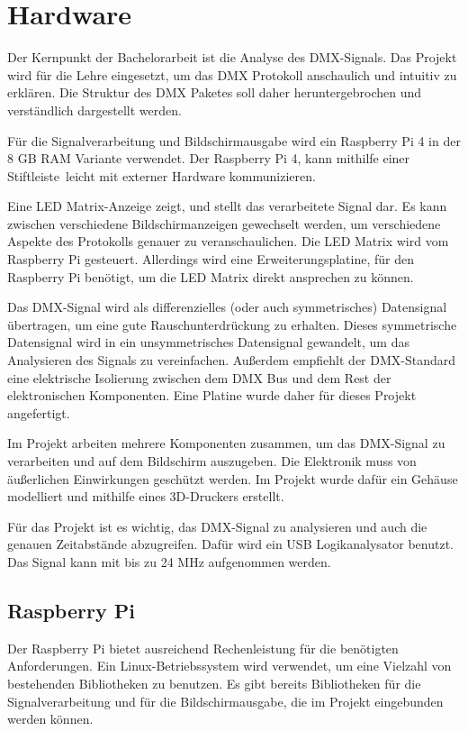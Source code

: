 \chapter{Hardware}

Der Kernpunkt der Bachelorarbeit ist die Analyse des DMX-Signals. Das Projekt wird für die Lehre eingesetzt, um das DMX Protokoll anschaulich und intuitiv zu erklären. Die Struktur des DMX Paketes soll daher heruntergebrochen und verständlich dargestellt werden.

Für die Signalverarbeitung und Bildschirmausgabe wird ein Raspberry Pi 4 in der 8 GB RAM Variante verwendet. Der Raspberry Pi 4, kann mithilfe einer Stiftleiste leicht mit externer Hardware kommunizieren.

Eine LED Matrix-Anzeige zeigt, und stellt das verarbeitete Signal dar. Es kann zwischen verschiedene Bildschirmanzeigen gewechselt werden, um verschiedene Aspekte des Protokolls genauer zu veranschaulichen. Die LED Matrix wird vom Raspberry Pi gesteuert. Allerdings wird eine Erweiterungsplatine, für den Raspberry Pi benötigt, um die LED Matrix direkt ansprechen zu können.

Das DMX-Signal wird als differenzielles (oder auch symmetrisches) Datensignal übertragen, um eine gute Rauschunterdrückung zu erhalten. Dieses symmetrische Datensignal wird in ein unsymmetrisches Datensignal gewandelt, um das Analysieren des Signals zu vereinfachen. Außerdem empfiehlt der DMX-Standard eine elektrische Isolierung zwischen dem DMX Bus und dem Rest der elektronischen Komponenten. Eine Platine wurde daher für dieses Projekt angefertigt.

Im Projekt arbeiten mehrere Komponenten zusammen, um das DMX-Signal zu verarbeiten und auf dem Bildschirm auszugeben. Die Elektronik muss von äußerlichen Einwirkungen geschützt werden. Im Projekt wurde dafür ein Gehäuse modelliert und mithilfe eines 3D-Druckers erstellt.

Für das Projekt ist es wichtig, das DMX-Signal zu analysieren und auch die genauen Zeitabstände abzugreifen. Dafür wird ein USB Logikanalysator benutzt. Das Signal kann mit bis zu 24 MHz aufgenommen werden.

\section{Raspberry Pi}
Der Raspberry Pi bietet ausreichend Rechenleistung für die benötigten Anforderungen. Ein Linux-Betriebssystem wird verwendet, um eine Vielzahl von bestehenden Bibliotheken zu benutzen. Es gibt bereits Bibliotheken für die Signalverarbeitung und für die Bildschirmausgabe, die im Projekt eingebunden werden können.

